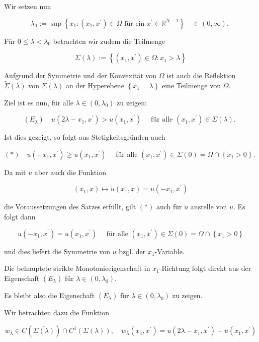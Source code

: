 \documentclass[10pt, letterpaper]{article}
\begin{document}
Wir setzen nun

$$
\lambda_{0}:=\sup \left\{x_{1}:\left(x_{1}, x^{\prime}\right) \in \Omega \text { für ein } x^{\prime} \in \mathbb{R}^{N-1}\right\} \quad \in(0, \infty) \text {. }
$$

Für $0 \leq \lambda<\lambda_{0}$ betrachten wir zudem die Teilmenge

$$
\Sigma(\lambda):=\left\{\left(x_{1}, x^{\prime}\right) \in \Omega: x_{1}>\lambda\right\}
$$

Aufgrund der Symmetrie und der Konvexität von $\Omega$ ist auch die Reflektion $\widetilde{\Sigma}(\lambda)$ von $\Sigma(\lambda)$ an der Hyperebene $\left\{x_{1}=\lambda\right\}$ eine Teilmenge von $\Omega$.

Ziel ist es nun, für alle $\lambda \in\left(0, \lambda_{0}\right)$ zu zeigen:

$$
\left(E_{\lambda}\right) \quad u\left(2 \lambda-x_{1}, x^{\prime}\right)>u\left(x_{1}, x^{\prime}\right) \quad \text { für alle }\left(x_{1}, x^{\prime}\right) \in \Sigma(\lambda) \text {. }
$$

Ist dies gezeigt, so folgt aus Stetigkeitsgründen auch

$(*) \quad u\left(-x_{1}, x^{\prime}\right) \geq u\left(x_{1}, x^{\prime}\right) \quad$ für alle $\left(x_{1}, x^{\prime}\right) \in \Sigma(0)=\Omega \cap\left\{x_{1}>0\right\}$.

Da mit $u$ aber auch die Funktion

$$
\left(x_{1}, x\right) \mapsto \tilde{u}\left(x_{1}, x\right)=u\left(-x_{1}, x^{\prime}\right)
$$

die Voraussetzungen des Satzes erfüllt, gilt $(*)$ auch für $\tilde{u}$ anstelle von $u$. Es folgt dann

$$
u\left(-x_{1}, x^{\prime}\right)=u\left(x_{1}, x^{\prime}\right) \quad \text { für alle }\left(x_{1}, x^{\prime}\right) \in \Sigma(0)=\Omega \cap\left\{x_{1}>0\right\}
$$

und dies liefert die Symmetrie von $u$ bzgl. der $x_{1}$-Variable.

Die behauptete strikte Monotonieeigenschaft in $x_{1}$-Richtung folgt direkt aus der Eigenschaft $\left(E_{\lambda}\right)$ für $\lambda \in\left(0, \lambda_{0}\right)$.

Es bleibt also die Eigenschaft $\left(E_{\lambda}\right)$ für $\lambda \in\left(0, \lambda_{0}\right)$ zu zeigen.

Wir betrachten dazu die Funktion

$$
w_{\lambda} \in C(\overline{\Sigma(\lambda)}) \cap C^{1}(\Sigma(\lambda)), \quad w_{\lambda}\left(x_{1}, x^{\prime}\right)=u\left(2 \lambda-x_{1}, x^{\prime}\right)-u\left(x_{1}, x^{\prime}\right)
$$
\end{document}
